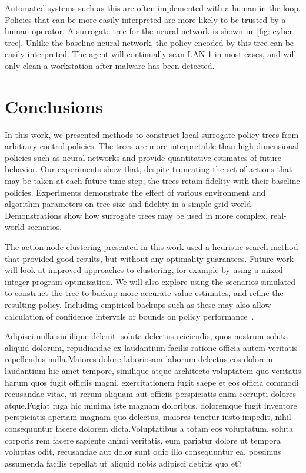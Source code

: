 \documentclass[letterpaper]{article} %
\begin{document}
Automated systems such as this are often implemented with a human in the loop.
Policies that can be more easily interpreted are more likely to be trusted by a human operator.
A surrogate tree for the neural network is shown in~\cref{fig: cyber tree}.
Unlike the baseline neural network, the policy encoded by this tree can be easily interpreted.
The agent will continually scan LAN 1 in most cases, and will only clean a workstation after malware has been detected.

\section{Conclusions}
In this work, we presented methods to construct local surrogate policy trees from arbitrary control policies.
The trees are more interpretable than high-dimensional policies such as neural networks and provide quantitative estimates of future behavior.
Our experiments show that, despite truncating the set of actions that may be taken at each future time step, the trees retain fidelity with their baseline policies.
Experiments demonstrate the effect of various environment and algorithm parameters on tree size and fidelity in a simple grid world.
Demonstrations show how surrogate trees may be used in more complex, real-world scenarios.

The action node clustering presented in this work used a heuristic search method that provided good results, but without any optimality guarantees.
Future work will look at improved approaches to clustering, for example by using a mixed integer program optimization.
We will also explore using the scenarios simulated to construct the tree to backup more accurate value estimates, and refine the resulting policy.
Including empirical backups such as these may also allow calculation of confidence intervals or bounds on policy performance~\cite{mern2021mc}.

Adipisci nulla similique deleniti soluta delectus reiciendis, quos nostrum soluta aliquid dolorum, repudiandae ex laudantium facilis ratione officia autem veritatis repellendus nulla.Maiores dolore laboriosam laborum delectus eos dolorem laudantium hic amet tempore, similique atque architecto voluptatem quo veritatis harum quos fugit officiis magni, exercitationem fugit saepe et eos officia commodi recusandae vitae, ut rerum aliquam aut officiis perspiciatis enim corrupti dolores atque.Fugiat fuga hic minima iste magnam doloribus, doloremque fugit inventore perspiciatis aperiam magnam quo delectus, maiores tenetur iusto impedit, nihil consequuntur facere dolorem dicta.Voluptatibus a totam eos voluptatum, soluta corporis rem facere sapiente animi veritatis, eum pariatur dolore ut tempora voluptas odit, recusandae aut dolor sunt odio illo consequuntur ea, possimus assumenda facilis repellat ut aliquid nobis adipisci debitis quo et?\clearpage


\end{document}
